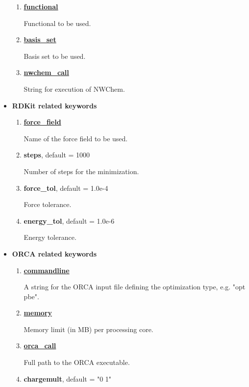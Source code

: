 \documentclass[a4paper]{article}
\begin{document}
\begin{itemize}
\begin{enumerate}
	\item{\underline{\textbf{functional}}}

Functional to be used. 


	\item{\textbf{\underline{basis\_set}}}
	

Basis set to be used.

	\item{\textbf{\underline{nwchem\_call}}}
	
String for execution of NWChem. 


\end{enumerate}
	\item{\textbf{\large{RDKit related keywords}}}
	\begin{enumerate}

	\item{\textbf{\underline{force\_field}}}
	
Name of the force field to be used.

	
	\item{\textbf{steps}}, default = 1000

Number of steps for the minimization.

	\item{\textbf{force\_tol}}, default = 1.0e-4 

Force tolerance.


	\item{\textbf{energy\_tol}}, default = 1.0e-6

Energy tolerance.

\end{enumerate}



\item{\textbf{\large{ORCA related keywords}}}
	\begin{enumerate}

	\item{\textbf{\underline{commandline}}}
	
A string for the ORCA input file defining the optimization type, e.g. "opt pbe".

	
	\item{\textbf{\underline{memory}}}

Memory limit (in MB) per processing core. 

	\item{\textbf{\underline{orca\_call}}}
	
Full path to the ORCA executable. 


	\item{\textbf{chargemult}}, default = "0 1" 


\end{enumerate}
\end{itemize}
\end{document}
